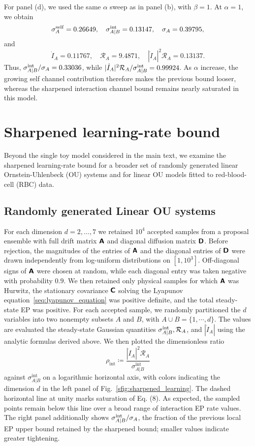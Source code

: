 For panel (d), we used the same $\alpha$ sweep as in panel (b), with $\beta=1$. At $\alpha=1$, we obtain
\[
    \sigma_A^{\rm self}=0.26649,
    \quad
    \sigma_{A|B}^{\rm int}=0.13147,
    \quad
    \sigma_A=0.39795,
\]
and
\[
    \dot I_A=0.11767,
    \quad
    \mathcal R_A=9.4871,
    \quad
    |\dot I_A|^2\mathcal R_A=0.13137.
\]
Thus, $\sigma_{A|B}^{\rm int}/\sigma_A=0.33036$, while $|\dot I_A|^2\mathcal R_A/\sigma_{A|B}^{\rm int}=0.99924$. As $\alpha$ increase, the growing self channel contribution therefore makes the previous bound looser, whereas the sharpened interaction channel bound remains nearly saturated in this model.


\section{Sharpened learning-rate bound}

Beyond the single toy model considered in the main text, we examine the sharpened learning-rate bound for a broader set of randomly generated linear Ornstein-Uhlenbeck (OU) systems and for linear OU models fitted to red-blood-cell (RBC) data.

\subsection{Randomly generated Linear OU systems}
\vspace*{-0.6\baselineskip}

For each dimension $d=2,...,7$ we retained $10^4$ accepted samples from a proposal ensemble with full drift matrix $\boldsymbol{\mathsf{A}}$ and diagonal diffusion matrix $\boldsymbol{\mathsf{D}}$. Before rejection, the magnitudes of the entries of $\boldsymbol{\mathsf{A}}$ and the diagonal entries of $\boldsymbol{\mathsf{D}}$ were drawn independently from log-uniform distributions on $[1,10^3]$. Off-diagonal signs of $\boldsymbol{\mathsf{A}}$ were chosen at random, while each diagonal entry was taken negative with probability $0.9$. We then retained only physical samples for which $\boldsymbol{\mathsf{A}}$ was Hurwitz, the stationary covariance $\boldsymbol{\mathsf{C}}$ solving the Lyapunov equation~\eqref{seq:lyapunov_equation} was positive definite, and the total steady-state EP was positive.
For each accepted sample, we randomly partitioned the $d$ variables into two nonempty subsets $A$ and $B$, with $A\cup B=\{1,\cdots,d\}$. The values are evaluated the steady-state Gaussian quantities $\sigma_{A|B}^{\rm int},\mathcal R_A$, and $|\dot I_A|$ using the analytic formulas derived above. We then plotted the dimensionless ratio
\[
    \rho_{\mathrm{int}}\coloneq
    \frac{\left|\dot I_{A}\right|^2\mathcal R_{A}}{\sigma_{A|B}^{\mathrm{int}}}
\]
against $\sigma_{A|B}^{\mathrm{int}}$ on a logarithmic horizontal axis, with colors indicating the dimension $d$ in the left panel of Fig.~\ref{sfig:sharpened_learning}. The dashed horizontal line at unity marks saturation of Eq. (8). As expected, the sampled points remain below this line over a broad range of interaction EP rate values. The right panel additionally shows $\sigma_{A|B}^{\rm int}/\sigma_A$, the fraction of the previous local EP upper bound retained by the sharpened bound; smaller values indicate greater tightening.

